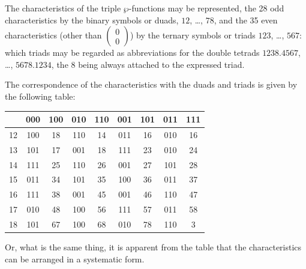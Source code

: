 \documentclass[11pt,a4paper]{book}
\begin{document}
\clearpage

The characteristics of the triple $\wp$-functions may be represented, the 28 odd characteristics by the binary symbols or duads, $12$, \dots, $78$, and the 35 even characteristics (other than $\begin{pmatrix} 0 \\ 0 \end{pmatrix}$) by the ternary symbols or triads $123$, \dots, $567$: which triads may be regarded as abbreviations for the double tetrads $1238.4567$, \dots, $5678.1234$, the 8 being always attached to the expressed triad.

\clearpage
The correspondence of the characteristics with the duads and triads is given by the following table:

\begin{center}
\begin{tabular}{c|cccccccc}
& 000 & 100 & 010 & 110 & 001 & 101 & 011 & 111 \\
\hline
12 & 100 & 18 & 110 & 14 & 011 & 16 & 010 & 16 \\
13 & 101 & 17 & 001 & 18 & 111 & 23 & 010 & 24 \\
14 & 111 & 25 & 110 & 26 & 001 & 27 & 101 & 28 \\
15 & 011 & 34 & 101 & 35 & 100 & 36 & 011 & 37 \\
16 & 111 & 38 & 001 & 45 & 001 & 46 & 110 & 47 \\
17 & 010 & 48 & 100 & 56 & 111 & 57 & 011 & 58 \\
18 & 101 & 67 & 100 & 68 & 010 & 78 & 110 & 3
\end{tabular}
\end{center}

Or, what is the same thing, it is apparent from the table that the characteristics can be arranged in a systematic form.
\end{document}
